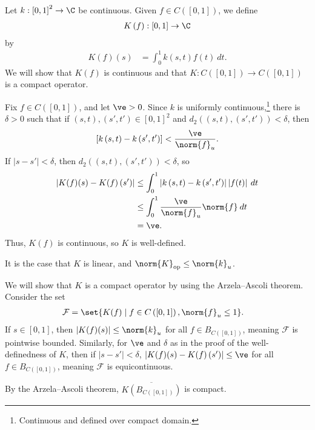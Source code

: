 \documentclass[10pt]{mypackage}
\begin{document}
\begin{example}
  Let $k: \left[0,1\right]^2\rightarrow \C$ be continuous. Given $f\in C\left([0,1]\right)$, we define
  \begin{align*}
    K\left(f\right): \left[0,1\right]\rightarrow \C
  \end{align*}
  by
  \begin{align*}
    K\left(f\right)(s) &= \int_{0}^{1} k\left(s,t\right)f(t)\:dt.
  \end{align*}
  We will show that $K\left(f\right)$ is continuous and that $K:C\left([0,1]\right)\rightarrow C\left([0,1]\right)$ is a compact operator.\newline

  Fix $f\in C\left([0,1]\right)$, and let $\ve > 0$. Since $k$ is uniformly continuous,\footnote{Continuous and defined over compact domain.} there is $\delta > 0$ such that if $\left(s,t\right),\left(s',t'\right)\in \left[0,1\right]^2$ and $d_2\left(\left(s,t\right),\left(s',t'\right)\right) < \delta$, then
  \begin{align*}
    \left[k\left(s,t\right) - k\left(s',t'\right)\right] < \frac{\ve}{\norm{f}_u}.
  \end{align*}
  If $\left\vert s-s' \right\vert < \delta$, then $d_{2}\left(\left(s,t\right),\left(s',t'\right)\right) < \delta$, so
  \begin{align*}
    \left\vert K(f)(s) - K(f)\left(s'\right) \right\vert &\leq \int_{0}^{1} \left\vert k\left(s,t\right)-k\left(s',t'\right) \right\vert\left\vert f(t) \right\vert\:dt\\
                                                         &\leq \int_{0}^{1} \frac{\ve}{\norm{f}_u}\norm{f}\:dt\\
                                                         &= \ve.
  \end{align*}
  Thus, $K(f)$ is continuous, so $K$ is well-defined.\newline

  It is the case that $K$ is linear, and $\norm{K}_{\text{op}}\leq \norm{k}_{u}$.\newline

  We will show that $K$ is a compact operator by using the Arzela--Ascoli theorem. Consider the set
  \begin{align*}
    \mathcal{F} &= \set{K(f)\mid f\in C\left(\left[0,1\right]\right),\norm{f}_{u}\leq 1}.
  \end{align*}
  If $s\in [0,1]$, then $\left\vert K(f)(s) \right\vert\leq \norm{k}_{u}$ for all $f\in B_{C\left([0,1]\right)}$, meaning $\mathcal{F}$ is pointwise bounded. Similarly, for $\ve $ and $\delta$ as in the proof of the well-definedness of $K$, then if $\left\vert s-s' \right\vert < \delta$, $\left\vert K(f)(s) - K(f)\left(s'\right) \right\vert\leq \ve$ for all $f\in B_{C\left([0,1]\right)}$, meaning $\mathcal{F}$ is equicontinuous.\newline

  By the Arzela--Ascoli theorem, $\overline{K\left(B_{C\left([0,1]\right)}\right)}$ is compact.
\end{example}
\end{document}
